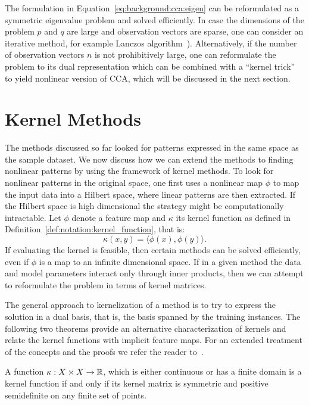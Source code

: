 The formulation in Equation~\ref{eq:background:cca:eigen} can be reformulated as a symmetric eigenvalue
problem and solved efficiently. In case the dimensions of the problem $p$ and $q$ are large and
observation vectors are sparse, one can consider an iterative method, for example Lanczos
algorithm~\cite{LAL}). Alternatively, if the number of observation vectors $n$ is not prohibitively
large, one can reformulate the problem to its dual representation which can be combined with a ``kernel trick''~\cite{FBMJ}
to yield nonlinear version of CCA, which will be discussed in the next section.

\section{Kernel Methods}\label{chap:background:kernels}
The methods discussed so far looked for patterns expressed in the same space as the sample dataset. We now discuss how we can extend the methods to finding nonlinear patterns by using the framework of kernel methods.
To look for nonlinear patterns in the original space, one first uses a nonlinear map $\phi$ to map the input data into a Hilbert space, where linear patterns are then extracted. If the Hilbert space is high dimensional the strategy might be computationally intractable.
Let $\phi$ denote a feature map and $\kappa$ its kernel function as defined in Definition~\ref{def:notation:kernel_function}, that is:
$$ \kappa(x,y) = \langle \phi(x), \phi(y) \rangle.$$
If evaluating the kernel is feasible, then certain methods can be solved efficiently, even
if $\phi$ is a map to an infinite dimensional space. If in a given method the data and model parameters interact only through inner products, then
we can attempt to reformulate the problem in terms of kernel matrices.

The general approach to kernelization of a method is to try to express the solution in a dual basis, that is, the basis spanned by the training instances.
The following two theorems provide an alternative characterization of kernels and relate the kernel functions with implicit feature maps. For an extended
treatment of the concepts and the proofs we refer the reader to~\cite{shawe-taylor04kernel}.

\begin{theorem}\label{thm:background:kernel_function}
A function $\kappa: X \times X \rightarrow \mathbb{R}$, which is either continuous or has a finite domain
is a kernel function if and only if its kernel matrix is symmetric and positive semidefinite on any finite set of points.
\end{theorem}

